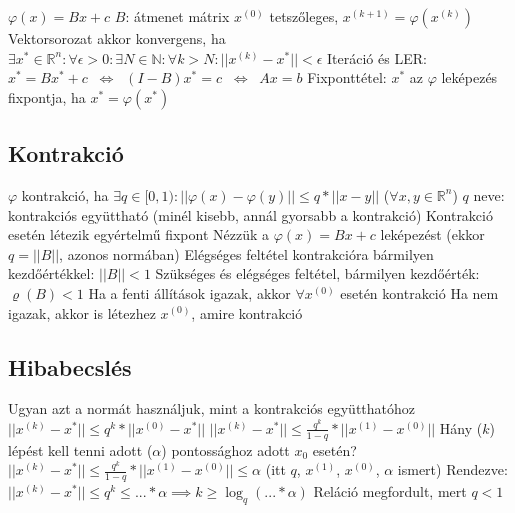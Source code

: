 \documentclass[12pt,a4paper]{article}
\begin{document}
\begin{outline}
	\1 $\varphi(x) = Bx+c$
		\2 $B$: átmenet mátrix
		\2 $x^{(0)}$ tetszőleges, $x^{(k+1)} = \varphi(x^{(k)})$
	\1 Vektorsorozat akkor konvergens, ha\\
	$\exists x^* \in \mathbb{R}^n: \forall \epsilon > 0: \exists N \in \mathbb{N}: \forall k > N: ||x^{(k)} - x^*|| < \epsilon$
	\1 Iteráció és LER: $x^* = B x^* + c \;\;\Leftrightarrow\;\; (I - B) x^* = c \;\;\Leftrightarrow\;\; Ax=b$
	\1 Fixponttétel: $x^*$ az $\varphi$ leképezés fixpontja, ha $x^* = \varphi(x^*)$
\end{outline}

\subsection{Kontrakció}

\begin{outline}
	\1 $\varphi$ kontrakció, ha $\exists q \in [0,1):
	||\varphi(x) - \varphi(y)|| \le q * ||x-y||$ \; ($\forall x,y \in \mathbb{R}^n$)
	\1 $q$ neve: kontrakciós együttható (minél kisebb, annál gyorsabb a kontrakció)
	\1 Kontrakció esetén létezik egyértelmű fixpont	
	\1 Nézzük a $\varphi(x) = Bx+c$ leképezést \;\;(ekkor $q = ||B||$, azonos normában)
		\2 Elégséges feltétel kontrakcióra bármilyen kezdőértékkel: $||B|| < 1$
		\2 Szükséges és elégséges feltétel, bármilyen kezdőérték: $\varrho(B) < 1$
		\2 Ha a fenti állítások igazak, akkor $\forall x^{(0)}$ esetén kontrakció
		\2 Ha nem igazak, akkor is létezhez $x^{(0)}$, amire kontrakció
\end{outline}

\subsection{Hibabecslés}

\begin{outline}
	\1 Ugyan azt a normát használjuk, mint a kontrakciós együtthatóhoz
	\1 $||x^{(k)} - x^*|| \le q^k * ||x^{(0)} - x^*||$
	\1 $||x^{(k)} - x^*|| \le \frac{q^k}{1-q} * ||x^{(1)} - x^{(0)}||$
	\1 Hány ($k$) lépést kell tenni adott ($\alpha$) pontossághoz adott $x_0$ esetén?
		\2 $||x^{(k)} - x^*|| \le \frac{q^k}{1-q} * ||x^{(1)} - x^{(0)}|| \le \alpha$
		\;\; (itt $q$, $x^{(1)}$, $x^{(0)}$, $\alpha$ ismert)
		\2 Rendezve: $||x^{(k)} - x^*|| \le q^k \le ... * \alpha
		\implies k \ge \log_{q}(... * \alpha)$
			\3 Reláció megfordult, mert $q < 1$
\end{outline}

\pagebreak
\end{document}

